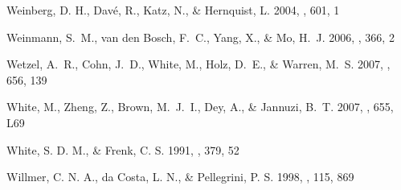 \documentclass[]{emulateapj}
\begin{document}
\begin{thebibliography}{999}
Weinberg, D. H., Dav\'e, R., Katz, N., \& Hernquist, L. 2004, \apj, 601, 1


Weinmann, S.\ M., van den Bosch, F.\ C., Yang, X., \& Mo, H.\ J. 2006,
\mnras, 366, 2

Wetzel, A.\ R., Cohn, J.\ D., White, M., Holz, D.\ E., \& Warren, M.\ S. 2007, 
\apj, 656, 139    




White, M., Zheng, Z., Brown, M.\ J.\ I., Dey, A., \& Jannuzi, B.\ T. 2007,
\apj, 655, L69

White, S. D. M., \& Frenk, C. S. 1991, \apj, 379, 52


Willmer, C. N. A., da Costa, L. N., \& Pellegrini, P. S. 1998, \aj, 115, 869





\end{thebibliography}
\end{document}
